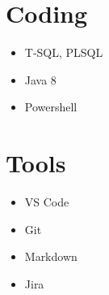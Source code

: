 \documentclass[letterpaper,11pt]{article}
\begin{document}
\hspace{0.2cm}
\begin{minipage}[t]{0.15\linewidth}
	\section{Coding}
	\begin{itemize}[leftmargin=*]
		\item T-SQL, PLSQL		
		\item Java 8		
		\item Powershell		
	\end{itemize}
	\section{Tools}
	\begin{itemize}[leftmargin=*]
		\item VS Code
		\item Git		
		\item Markdown
		\item Jira
	\end{itemize}
\end{minipage}




%


\end{document}

